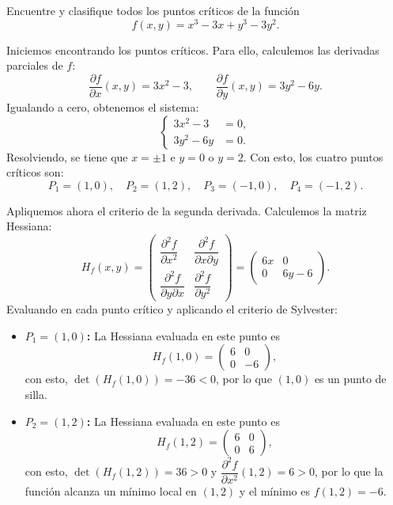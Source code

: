 \documentclass[11pt,respuestas,a4]{aleph-examen}
\begin{document}
\encabezado


\begin{preguntas}

\item
Encuentre y clasifique todos los puntos críticos de la función
\[
    f(x,y) = x^3 - 3x + y^3 - 3y^2.
\]

\begin{respuesta}
Iniciemos encontrando los puntos críticos. Para ello, calculemos las derivadas parciales de $f$:
\[
    \frac{\partial f}{\partial x}(x,y) = 3x^2 - 3,
    \qquad
    \frac{\partial f}{\partial y}(x,y) = 3y^2 - 6y.
\]
Igualando a cero, obtenemos el sistema:
\[
    \left\{
    \begin{aligned}
        3x^2 - 3 &= 0,\\
        3y^2 - 6y &= 0.
    \end{aligned}
    \right.
\]
Resolviendo, se tiene que $x = \pm 1$ e $y = 0$ o $y = 2$. Con esto, los cuatro puntos críticos son:
\[
    P_1 = (1,0),\quad P_2=(1,2),\quad P_3=(-1,0),\quad P_4=(-1,2).
\]

Apliquemos ahora el criterio de la segunda derivada. Calculemos la matriz Hessiana:
\[
    H_f(x,y)
    =
    \begin{pmatrix}
        \dfrac{\partial^2 f}{\partial x^2} & \dfrac{\partial^2 f}{\partial x\partial y}\\[10pt]
        \dfrac{\partial^2 f}{\partial y\partial x} & \dfrac{\partial^2 f}{\partial y^2}
    \end{pmatrix}
    =
    \begin{pmatrix}
        6x & 0\\
        0 & 6y-6
    \end{pmatrix}.
\]
Evaluando en cada punto crítico y aplicando el criterio de Sylvester:
\begin{itemize}
    \item \textbf{$P_1=(1,0)$:} La Hessiana evaluada en este punto es
    \[
        H_f(1,0) = \begin{pmatrix} 6 & 0 \\ 0 & -6 \end{pmatrix},
    \]
    con esto, $\det(H_f(1,0)) = -36 < 0$, por lo que $(1,0)$ es un punto de silla.

    \item \textbf{$P_2=(1,2)$:} La Hessiana evaluada en este punto es
    \[
        H_f(1,2) = \begin{pmatrix} 6 & 0 \\ 0 & 6 \end{pmatrix},
    \]
    con esto, $\det(H_f(1,2)) = 36 > 0$ y $\dfrac{\partial^2 f}{\partial x^2}(1,2) = 6 > 0$, por lo que la función alcanza un mínimo local en $(1,2)$ y el mínimo es $f(1,2) = -6$.


\end{itemize}
\end{respuesta}
\end{preguntas}
\end{document}
